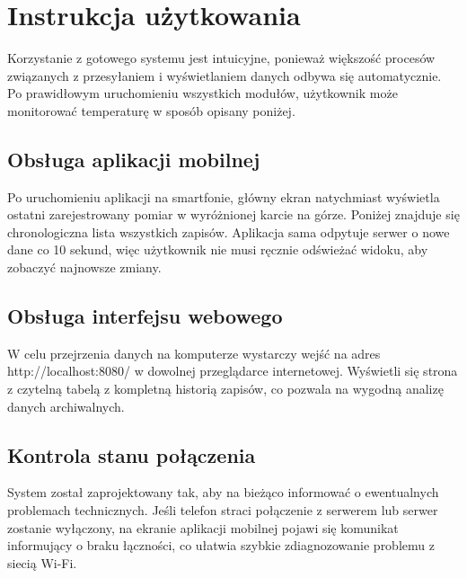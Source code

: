 \pagebreak

\section{Instrukcja użytkowania}
Korzystanie z gotowego systemu jest intuicyjne, ponieważ większość procesów związanych z przesyłaniem i wyświetlaniem danych odbywa się automatycznie. Po prawidłowym uruchomieniu wszystkich modułów, użytkownik może monitorować temperaturę w sposób opisany poniżej.

\subsection{Obsługa aplikacji mobilnej}
Po uruchomieniu aplikacji na smartfonie, główny ekran natychmiast wyświetla ostatni zarejestrowany pomiar w wyróżnionej karcie na górze. Poniżej znajduje się chronologiczna lista wszystkich zapisów. Aplikacja sama odpytuje serwer o nowe dane co 10 sekund, więc użytkownik nie musi ręcznie odświeżać widoku, aby zobaczyć najnowsze zmiany.

\subsection{Obsługa interfejsu webowego}
W celu przejrzenia danych na komputerze wystarczy wejść na adres http://localhost:8080/ w dowolnej przeglądarce internetowej. Wyświetli się strona z czytelną tabelą z kompletną historią zapisów, co pozwala na wygodną analizę danych archiwalnych.

\subsection{Kontrola stanu połączenia}
System został zaprojektowany tak, aby na bieżąco informować o ewentualnych problemach technicznych. Jeśli telefon straci połączenie z serwerem lub serwer zostanie wyłączony, na ekranie aplikacji mobilnej pojawi się komunikat informujący o braku łączności, co ułatwia szybkie zdiagnozowanie problemu z siecią Wi-Fi.
